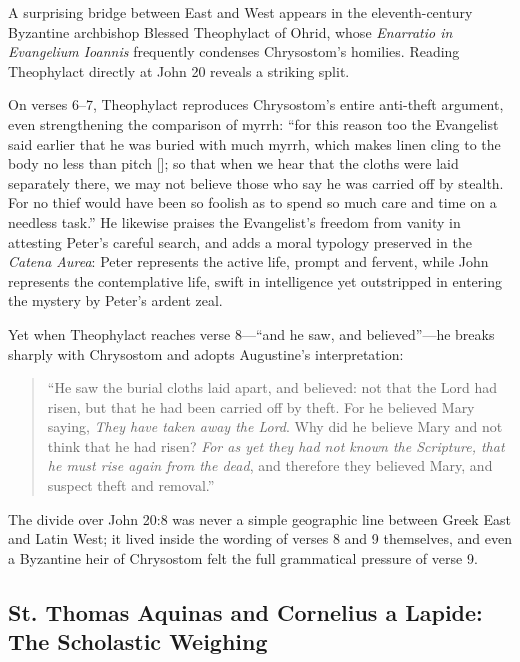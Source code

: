 A surprising bridge between East and West appears in the eleventh-century Byzantine archbishop Blessed Theophylact of Ohrid, whose \emph{Enarratio in Evangelium Ioannis} frequently condenses Chrysostom's homilies. Reading Theophylact directly at John 20 reveals a striking split.

On verses 6--7, Theophylact reproduces Chrysostom's entire anti-theft argument, even strengthening the comparison of myrrh: ``for this reason too the Evangelist said earlier that he was buried with much myrrh, which makes linen cling to the body no less than pitch []; so that when we hear that the cloths were laid separately there, we may not believe those who say he was carried off by stealth. For no thief would have been so foolish as to spend so much care and time on a needless task.'' He likewise praises the Evangelist's freedom from vanity in attesting Peter's careful search, and adds a moral typology preserved in the \emph{Catena Aurea}: Peter represents the active life, prompt and fervent, while John represents the contemplative life, swift in intelligence yet outstripped in entering the mystery by Peter's ardent zeal.

Yet when Theophylact reaches verse 8---``and he saw, and believed''---he breaks sharply with Chrysostom and adopts Augustine's interpretation:
\begin{quote}
``He saw the burial cloths laid apart, and believed: not that the Lord had risen, but that he had been carried off by theft. For he believed Mary saying, \emph{They have taken away the Lord}. Why did he believe Mary and not think that he had risen? \emph{For as yet they had not known the Scripture, that he must rise again from the dead}, and therefore they believed Mary, and suspect theft and removal.''
\end{quote}
The divide over John 20:8 was never a simple geographic line between Greek East and Latin West; it lived inside the wording of verses 8 and 9 themselves, and even a Byzantine heir of Chrysostom felt the full grammatical pressure of verse 9.

\subsection{St. Thomas Aquinas and Cornelius a Lapide: The Scholastic Weighing}


